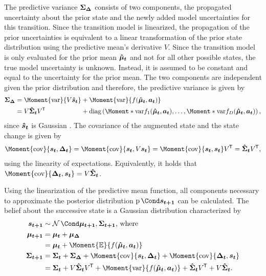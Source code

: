 The predictive variance $\bm{\Sigma_\Delta}$ consists of two components, the propagated uncertainty about the prior state and the newly added model uncertainties for this transition.
Since the transition model is linearized, the propagation of the prior uncertainties is equivalent to a linear transformation of the prior state distribution using the predictive mean's derivative $V$.
Since the transition model is only evaluated for the prior mean $\bm{\hat{\mu}_t}$ and not for all other possible states, the true model uncertainty is unknown.
Instead, it is assumed to be constant and equal to the uncertainty for the prior mean.
The two components are independent given the prior distribution and therefore, the predictive variance is given by
\begin{align}
    \begin{alignedat}{2}
        \mat{\Sigma_\Delta} &= \Moment{\var}{V \rv{\hat{s}_t}} &&+ \Moment{\var}{f(\rv{\hat{\mu}_t}, \mat{a_t})} \\
        &= V \mat{\hat{\Sigma}_t} V\tran &&+ \diag\left(
        \Moment*{\var}{f_1(\rv{\hat{\mu}_t}, \mat{a_t})},
        \ldots,
        \Moment*{\var}{f_D(\rv{\hat{\mu}_t}, \mat{a_t})}
    \right),
    \end{alignedat}
\end{align}
since $\bm{\hat{s}_t}$ is Gaussian \cite{petersen_matrix_2008}.
The covariance of the augmented state and the state change is given by
\begin{align}
    \Moment{\cov}{\rv{s_t}, \rv{\Delta_t}} = \Moment{\cov}{\rv{s_t}, V\rv{s_t}} = \Moment{\cov}{\rv{s_t}, \rv{s_t}}V\tran = \mat{\hat{\Sigma}_t}V\tran,
\end{align}
using the linearity of expectations. Equivalently, it holds that $\Moment{\cov}{\rv{\Delta_t}, \rv{s_t}} = V \mat{\hat{\Sigma}_t}$.

Using the linearization of the predictive mean function, all components necessary to approximate the posterior distribution $\Prob{\rv{s_{t+1}}}$ can be calculated.
The belief about the successive state is a Gaussian distribution characterized by
\begin{align}
    \begin{split}
        \rv{s_{t+1}} &\sim \Gaussian{\mat{\mu_{t+1}}, \mat{\Sigma_{t+1}}} \text{, where} \\
        \mat{\mu_{t+1}} &= \mat{\mu_t} + \mat{\mu_\Delta} \\
        &= \mat{\mu_t} + \Moment{\E}{f(\rv{\hat{\mu}_t}, \mat{a_t})} \\
        \mat{\Sigma_{t+1}} &= \mat{\Sigma_t} + \mat{\Sigma_\Delta} + \Moment{\cov}{\rv{s_t}, \rv{\Delta_t}} + \Moment{\cov}{\rv{\Delta_t}, \rv{s_t}} \\
        &= \mat{\Sigma_t} + V\mat{\hat{\Sigma}_t}V\tran + \Moment{\var}{f(\rv{\hat{\mu}_t}, \mat{a_t})} + \mat{\hat{\Sigma}_t}V\tran + V\mat{\hat{\Sigma}_t}.
    \end{split}
\end{align}

